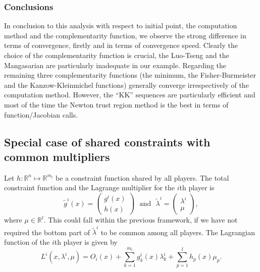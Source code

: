 \documentclass[11pt, a4paper]{article}
\newcommand{\txtm}[1]{\textrm{~~#1~~}}
\newcommand{\R}{\ensuremath{\mathbb{R}}}
\begin{document}
\subsubsection{Conclusions}
In conclusion to this analysis with respect to initial point, the computation method and the complementarity function, we observe the strong difference in terms of convergence, firstly and in terms of convergence speed. Clearly the choice of the complementarity function is crucial, the Luo-Tseng and the Mangasarian are particularly inadequate in our example. Regarding the remaining three complementarity functions (the minimum, the Fisher-Burmeister and the Kanzow-Kleinmichel functions) generally converge irrespectively of the computation method. However, the ``KK'' sequences are particularly efficient and most of the time the Newton trust region method is the best in terms of function/Jacobian calls.



\subsection{Special case of shared constraints with common multipliers}

Let $h:  \R^{n} \mapsto  \R^{m_l}$ be a constraint function shared by all players. 
The total constraint function and the Lagrange multiplier for the $i$th player is 
$$
\tilde g^i(x) = 
\left( \begin{matrix}
g^i(x) \\
h(x) 
\end{matrix} \right)
\txtm{and}
\tilde \lambda^i = 
\left( \begin{matrix}
\lambda^i \\
\mu
\end{matrix} \right),
$$
where $\mu \in \R^l$.
This could fall within the previous framework, if we have not required the bottom part of $\tilde \lambda^i$ to be common among all players. 
The Lagrangian function of the $i$th player is given by
$$
L ^i(x, \lambda^i, \mu) = O_i(x) + \sum_{k=1}^{m_i} g^i_k(x) \lambda_k^i + \sum_{p=1}^l h_p(x) \mu_p.
$$
\end{document}
